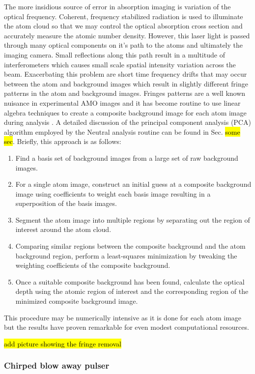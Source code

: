 The more insidious source of error in absorption imaging is variation of the optical frequency. Coherent, frequency stabilized radiation is used to illuminate the atom cloud so that we may control the optical absorption cross section and accurately measure the atomic number density. However, this laser light is passed through many optical components on it's path to the atoms and ultimately the imaging camera. Small reflections along this path result in a multitude of interferometers which causes small scale spatial intensity variation across the beam. Exacerbating this problem are short time frequency drifts that may occur between the atom and background images which result in slightly different fringe patterns in the atom and background images. Fringes patterns are a well known nuisance in experimental AMO images and it has become routine to use linear algebra techniques to create a composite background image for each atom image during analysis \cite{Segal2009}. A detailed discussion of the principal component analysis (PCA) algorithm employed by the Neutral analysis routine can be found in Sec. \hl{some sec}. Briefly, this approach is as follows:
\begin{enumerate}
\item Find a basis set of background images from a large set of raw background images.
\item For a single atom image, construct an initial guess at a composite background image using coefficients to weight each basis image resulting in a superposition of the basis images.
\item Segment the atom image into multiple regions by separating out the region of interest around the atom cloud.
\item Comparing similar regions between the composite background and the atom background region, perform a least-squares minimization by tweaking the weighting coefficients of the composite background.
\item Once a suitable composite background has been found, calculate the optical depth using the atomic region of interest and the corresponding region of the minimized composite background image.
\end{enumerate}
This procedure may be numerically intensive as it is done for each atom image but the results have proven remarkable for even modest computational resources. 

\hl{add picture showing the fringe removal}

\subsubsection{Chirped blow away pulser}

